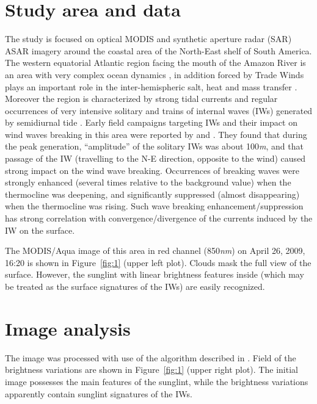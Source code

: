 \documentclass[draft,grl]{agutex}
\begin{document}
\begin{article}
\section{Study area and data}

The study is focused on optical MODIS and synthetic aperture radar (SAR) ASAR imagery around the coastal area of the North-East shelf of South America. The western equatorial Atlantic region facing the mouth of the Amazon River is an area with very complex ocean dynamics \citep{Silva2010}, in addition forced by Trade Winds \citep{Augustinus2004} plays an important role in the inter-hemispheric salt, heat and mass transfer \citep{Dengler2004, Schmitz1993}. Moreover the region is characterized by strong tidal currents \citep{Oltman1968, RockwellGeyer1996, LeBars2010} and regular occurrences of very intensive solitary and trains of internal waves (IWs) generated by semidiurnal tide \citep{Burdyugov1987, Ivanov1993}. Early field campaigns targeting IWs and their impact on wind waves breaking in this area were reported by \cite{Dulov1986}  and \cite{Burdyugov1987}. They found that during the peak generation, ``amplitude'' of the solitary IWs was about 100\textit{m}, and that passage of the IW (travelling to the N-E direction, opposite to the wind) caused strong impact on the wind wave breaking.  Occurrences of breaking waves were strongly enhanced (several times relative to the background value) when the thermocline was deepening, and significantly suppressed (almost disappearing) when the thermocline was rising. Such wave breaking enhancement/suppression has strong correlation with convergence/divergence of the currents induced by the IW on the surface.

The MODIS/Aqua image of this area in red channel (850\textit{nm}) on April 26, 2009, 16:20 is shown in Figure~\ref{fig:1} (upper left plot). Clouds mask the full view of the surface. However, the sunglint with linear brightness features inside (which may be treated as the surface signatures of the IWs) are easily recognized.


\section{Image analysis}

The image was processed with use of the algorithm described in \citep{Kudryavtsev2012a}. Field of the brightness variations  are shown in Figure~\ref{fig:1} (upper right plot). The initial image possesses the main features of the sunglint, while the brightness variations apparently contain sunglint signatures of the IWs.


\end{article}
\end{document}
